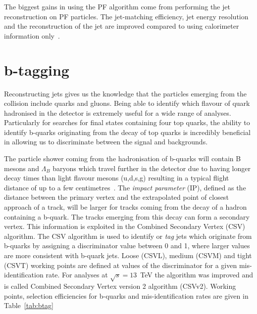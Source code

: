 The biggest gains in using the PF algorithm come from performing the jet reconstruction on PF particles. The jet-matching efficiency, jet energy resolution and the reconstruction of the jet \pt are improved compared to using calorimeter information only~\cite{CMS-PAS-PFT-10-001}. 

\section{b-tagging ~\label{sec:btagreco}}
Reconstructing jets gives us the knowledge that the particles emerging from the collision include quarks and gluons. Being able to identify which flavour of quark hadronised in the detector is extremely useful for a wide range of analyses. Particularly for searches for final states containing four top quarks, the ability to identify b-quarks originating from the decay of top quarks is incredibly beneficial in allowing us to discriminate between the signal and backgrounds. 

The particle shower coming from the hadronisation of b-quarks will contain B mesons and $\Lambda_{B}$ baryons which travel further in the detector due to having longer decay times than light flavour mesons (u,d,s,g) resulting in a typical flight distance of up to a few centimetres~\cite{Collaboration2015BS0}. The \emph{impact parameter} (IP), defined as the distance between the primary vertex and the extrapolated point of closest approach of a track, will be larger for tracks coming from the decay of a hadron containing a b-quark. The tracks emerging from this decay can form a secondary vertex. This information is exploited in the Combined Secondary Vertex (CSV) algorithm. The CSV algorithm is used to identify or \emph{tag} jets which originate from b-quarks by assigning a discriminator value between 0 and 1, where larger values are more consistent with b-quark jets. Loose (CSVL), medium (CSVM) and tight (CSVT) working points are defined at values of the discriminator for a given mis-identification rate. For analyses at $\sqrt{s} = 13$~TeV the algorithm was improved and is called Combined Secondary Vertex version 2 algorithm (CSVv2). Working points, selection efficiencies for b-quarks and mis-identification rates are given in Table~\ref{tab:btag} 


